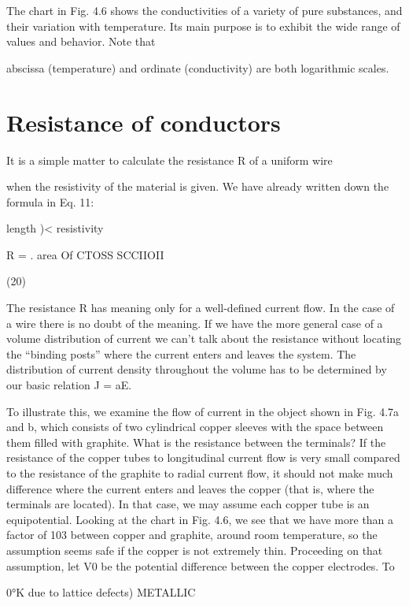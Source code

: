 The chart in Fig. 4.6 shows the conductivities of a variety of pure
substances, and their variation with temperature. Its main purpose
is to exhibit the wide range of values and behavior. Note that

abscissa (temperature) and ordinate (conductivity) are both logarithmic
scales.

\section{Resistance of conductors}

It is a simple matter to calculate the resistance R of a uniform wire

when the resistivity of the material is given. We have already written
down the formula in Eq. 11:

length )< resistivity

R = .
area Of CTOSS SCCIIOII

(20)
\begin{equation}
\end{equation}

The resistance R has meaning only for a well-defined current flow.
In the case of a wire there is no doubt of the meaning. If we have the
more general case of a volume distribution of current we can't talk
about the resistance without locating the ``binding posts'' where the
current enters and leaves the system. The distribution of current
density throughout the volume has to be determined by our basic
relation J = aE.

To illustrate this, we examine the flow of current in the object
shown in Fig. 4.7a and b, which consists of two cylindrical copper
sleeves with the space between them filled with graphite. What is
the resistance between the terminals? If the resistance of the copper
tubes to longitudinal current flow is very small compared to the
resistance of the graphite to radial current flow, it should not make
much difference where the current enters and leaves the copper (that
is, where the terminals are located). In that case, we may assume
each copper tube is an equipotential. Looking at the chart in Fig. 4.6,
we see that we have more than a factor of 103 between copper and
graphite, around room temperature, so the assumption seems safe if
the copper is not extremely thin. Proceeding on that assumption, let
V0 be the potential difference between the copper electrodes. To

0°K due to lattice defects) METALLIC


